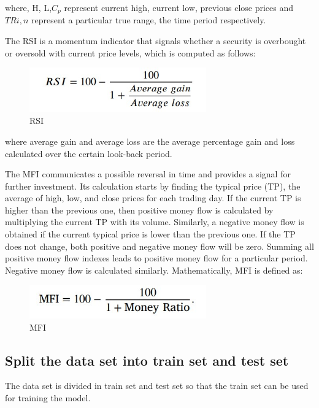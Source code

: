 where, H, L,$ C_p$ represent current high, current low, previous close prices and $T Ri, n$ represent a particular true range, the time period respectively.
\par 
The RSI is a momentum indicator that signals whether a security is overbought or oversold with current price levels, which is computed as follows:\par 
\begin{figure}[tbh] %
\begin{center}
	\includegraphics[width=3in]{images/fmla2.jpg} 
	\caption{RSI} %
	\label{RSI} %
\end{center}
\end{figure}
where average gain and average loss are the average percentage gain and loss calculated over the certain look-back period.
\par 
The MFI communicates a possible reversal in time and provides a signal for further investment. Its calculation starts by finding the typical price (TP), the average of high, low, and close prices for each trading day. If the current TP is higher than the previous one, then positive money flow is calculated by multiplying the current TP with its volume. Similarly, a negative money flow is obtained if the current typical price is lower than the previous one. If the TP does not change, both positive and negative money flow will be zero. Summing all positive money flow indexes leads to positive money flow for a particular period. Negative money flow is calculated similarly. Mathematically, MFI is defined as:
\begin{figure}[tbh] %
\begin{center}
	\includegraphics[width=3in]{images/fmla3.jpg} 
	\caption{MFI} %
	\label{MFI} %
\end{center}
\end{figure}
\subsection{Split the data set into train set and test set}
\vspace{-18pt}
The data set is divided in train set and test set so that the train set can be used for training the model.
